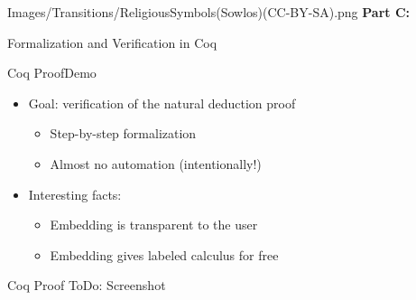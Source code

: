 \begin{transitionframe}{Images/Transitions/ReligiousSymbols(Sowlos)(CC-BY-SA).png}
\textbf{Part C:}

Formalization and Verification in Coq
\end{transitionframe}

\begin{frame}{Coq Proof}{Demo}
\begin{itemize}
\item \begin{LARGE} Goal: verification of the natural deduction proof \end{LARGE}
\begin{itemize}
\item \begin{large} Step-by-step formalization \end{large}
\pause
\item \begin{large} Almost no automation (intentionally!) \end{large}
\end{itemize}
%
\pause
\item \begin{LARGE} Interesting facts: \end{LARGE}
\begin{itemize}
\item \begin{large} Embedding is transparent to the user \end{large}
\pause
\item \begin{large} Embedding gives labeled calculus for free \end{large}
\end{itemize}
\end{itemize}
\end{frame}

\begin{frame}{Coq Proof}
ToDo: Screenshot
\end{frame}
